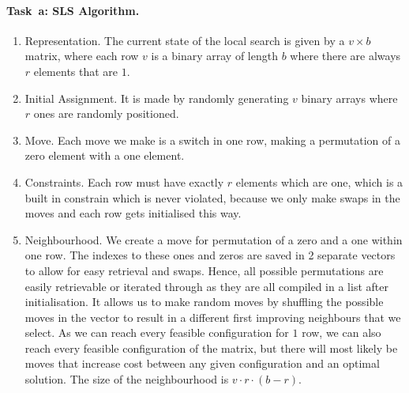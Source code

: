 \paragraph{Task~a: SLS Algorithm.}
\begin{enumerate}
\item Representation. 
The current state of the local search is given by a $v \times b$ matrix, where each row $v$ is a binary array of length $b$ where there are always $r$ elements that are $1$. 

  
\item Initial Assignment. It is made by randomly generating $v$ binary arrays where $r$ ones are randomly positioned. %
\item Move. Each move we make is a switch in one row, making a permutation of a zero element with a one element.
\item Constraints. Each row must have exactly $r$ elements which are one, which is a built in constrain which is never violated, because we only make swaps in the moves and each row gets initialised this way. 
\item Neighbourhood. We create a move for permutation of a zero and a one within one row. The indexes to these ones and zeros are saved in 2 separate vectors to allow for easy retrieval and swaps. Hence, all possible permutations are easily retrievable or iterated through as they are all compiled in a list after initialisation. It allows us to make random moves by shuffling the possible moves in the vector to result in a different first improving neighbours that we select. As we can reach every feasible configuration for $1$ row, we can also reach every feasible configuration of the matrix, but there will most likely be moves that increase cost between any given configuration and an optimal solution. The size of the neighbourhood is $v\cdot r \cdot (b-r)$. 

\end{enumerate}
